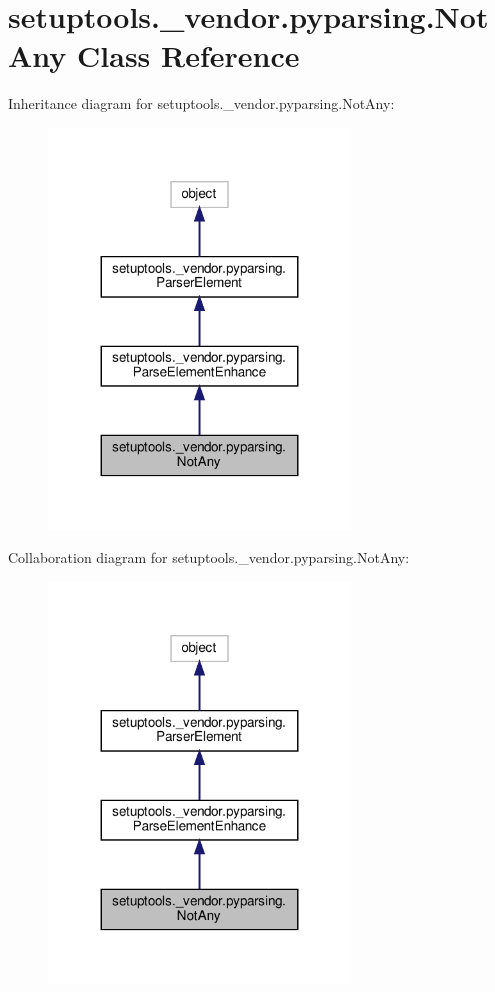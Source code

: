 \hypertarget{classsetuptools_1_1__vendor_1_1pyparsing_1_1NotAny}{}\section{setuptools.\+\_\+vendor.\+pyparsing.\+Not\+Any Class Reference}
\label{classsetuptools_1_1__vendor_1_1pyparsing_1_1NotAny}


Inheritance diagram for setuptools.\+\_\+vendor.\+pyparsing.\+Not\+Any\+:
\nopagebreak
\begin{figure}[H]
\begin{center}
\leavevmode
\includegraphics[width=227pt]{classsetuptools_1_1__vendor_1_1pyparsing_1_1NotAny__inherit__graph}
\end{center}
\end{figure}


Collaboration diagram for setuptools.\+\_\+vendor.\+pyparsing.\+Not\+Any\+:
\nopagebreak
\begin{figure}[H]
\begin{center}
\leavevmode
\includegraphics[width=227pt]{classsetuptools_1_1__vendor_1_1pyparsing_1_1NotAny__coll__graph}
\end{center}
\end{figure}
